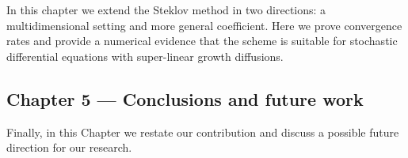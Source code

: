 			In this chapter  we extend  the Steklov method in two directions:
		a multidimensional setting and more general coefficient. Here we prove convergence rates and provide a 
		numerical evidence that the scheme is suitable for stochastic differential equations with super-linear growth 
		diffusions. 
	
	\subsection*{Chapter 5 --- Conclusions and future work}
	
			Finally, in this Chapter  we restate our contribution and discuss a possible future direction for our 
			research.